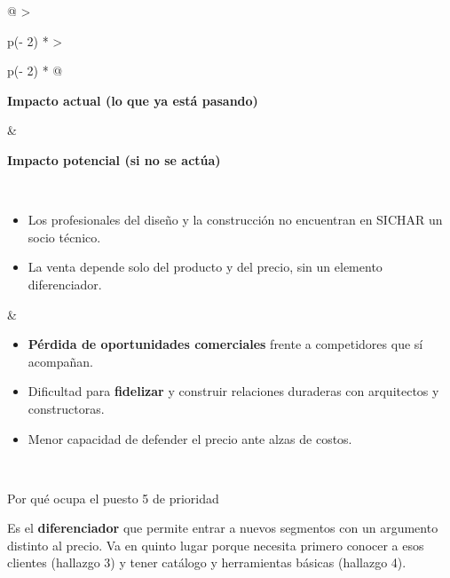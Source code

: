\documentclass[11pt,a4paper]{article}
\begin{document}
\begin{longtable}[]{@{}
  >{\raggedright\arraybackslash}p{(\columnwidth - 2\tabcolsep) * }
  >{\raggedright\arraybackslash}p{(\columnwidth - 2\tabcolsep) * }@{}}
\toprule\noalign{}
\begin{minipage}[b]{\linewidth}\raggedright
\textbf{Impacto actual (lo que ya está pasando)}
\end{minipage} & \begin{minipage}[b]{\linewidth}\raggedright
\textbf{Impacto potencial (si no se actúa)}
\end{minipage} \\
\midrule\noalign{}
\endfirsthead
\bottomrule\noalign{}
\endlastfoot
\begin{minipage}[t]{\linewidth}\raggedright
\begin{itemize}
\item
  Los profesionales del diseño y la construcción no encuentran en SICHAR un socio técnico.
\item
  La venta depende solo del producto y del precio, sin un elemento diferenciador.
\end{itemize}
\end{minipage} & \begin{minipage}[t]{\linewidth}\raggedright
\begin{itemize}
\item
  \textbf{Pérdida de oportunidades comerciales} frente a competidores que sí acompañan.
\item
  Dificultad para \textbf{fidelizar} y construir relaciones duraderas con arquitectos y
  constructoras.
\item
  Menor capacidad de defender el precio ante alzas de costos.
\end{itemize}
\end{minipage} \\
\end{longtable}

\begin{cajaaviso}{Por qué ocupa el puesto 5 de prioridad}

Es el \textbf{diferenciador} que permite entrar a nuevos segmentos con un argumento distinto al
precio. Va en quinto lugar porque necesita primero conocer a esos clientes (hallazgo 3) y tener
catálogo y herramientas básicas (hallazgo 4).

\end{cajaaviso}

\end{document}
